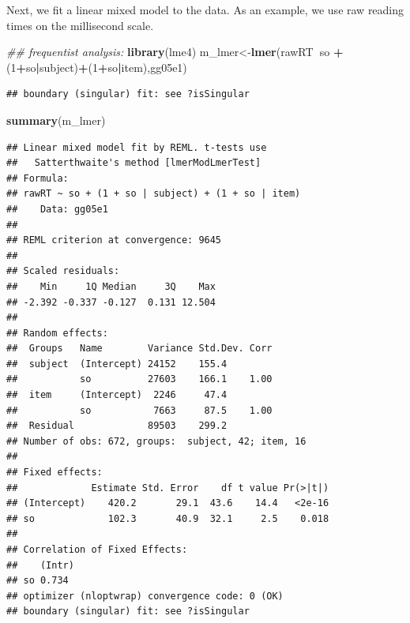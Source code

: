 \documentclass[12pt,]{krantz}
\newenvironment{Shaded}{\begin{snugshade}}{\end{snugshade}}
\newcommand{\CommentTok}[1]{\textcolor[rgb]{0.56,0.35,0.01}{\textit{#1}}}
\newcommand{\DataTypeTok}[1]{\textcolor[rgb]{0.13,0.29,0.53}{#1}}
\newcommand{\DecValTok}[1]{\textcolor[rgb]{0.00,0.00,0.81}{#1}}
\newcommand{\KeywordTok}[1]{\textcolor[rgb]{0.13,0.29,0.53}{\textbf{#1}}}
\newcommand{\NormalTok}[1]{#1}
\newcommand{\OperatorTok}[1]{\textcolor[rgb]{0.81,0.36,0.00}{\textbf{#1}}}
\newcommand{\OtherTok}[1]{\textcolor[rgb]{0.56,0.35,0.01}{#1}}
\newcommand{\StringTok}[1]{\textcolor[rgb]{0.31,0.60,0.02}{#1}}
\begin{document}
\begin{Shaded}
\end{Shaded}

Next, we fit a linear mixed model to the data. As an example, we use raw reading times on the millisecond scale.

\begin{Shaded}
\begin{Highlighting}[]
\CommentTok{## frequentist analysis:}
\KeywordTok{library}\NormalTok{(lme4)}
\NormalTok{m_lmer<-}\KeywordTok{lmer}\NormalTok{(rawRT}\OperatorTok{~}\NormalTok{so }\OperatorTok{+}\StringTok{ }\NormalTok{(}\DecValTok{1}\OperatorTok{+}\NormalTok{so}\OperatorTok{|}\NormalTok{subject)}\OperatorTok{+}\NormalTok{(}\DecValTok{1}\OperatorTok{+}\NormalTok{so}\OperatorTok{|}\NormalTok{item),gg05e1)}
\end{Highlighting}
\end{Shaded}

\begin{verbatim}
## boundary (singular) fit: see ?isSingular
\end{verbatim}

\begin{Shaded}
\begin{Highlighting}[]
\KeywordTok{summary}\NormalTok{(m_lmer)}
\end{Highlighting}
\end{Shaded}

\begin{verbatim}
## Linear mixed model fit by REML. t-tests use
##   Satterthwaite's method [lmerModLmerTest]
## Formula: 
## rawRT ~ so + (1 + so | subject) + (1 + so | item)
##    Data: gg05e1
## 
## REML criterion at convergence: 9645
## 
## Scaled residuals: 
##    Min     1Q Median     3Q    Max 
## -2.392 -0.337 -0.127  0.131 12.504 
## 
## Random effects:
##  Groups   Name        Variance Std.Dev. Corr
##  subject  (Intercept) 24152    155.4        
##           so          27603    166.1    1.00
##  item     (Intercept)  2246     47.4        
##           so           7663     87.5    1.00
##  Residual             89503    299.2        
## Number of obs: 672, groups:  subject, 42; item, 16
## 
## Fixed effects:
##             Estimate Std. Error    df t value Pr(>|t|)
## (Intercept)    420.2       29.1  43.6    14.4   <2e-16
## so             102.3       40.9  32.1     2.5    0.018
## 
## Correlation of Fixed Effects:
##    (Intr)
## so 0.734 
## optimizer (nloptwrap) convergence code: 0 (OK)
## boundary (singular) fit: see ?isSingular
\end{verbatim}
\end{document}
